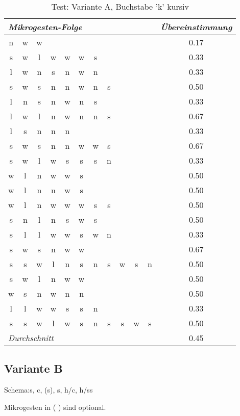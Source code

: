 \begin{table}[!h]
  \begin{center}
    \begin{tabular}{ c c c c c c c c c c c  | c }
\multicolumn{11}{l}{\emph{Mikrogesten-Folge}}&\emph{Übereinstimmung} \\ \hline
n&w&w&&&&&&&&&0.17 \\ \hline
s&w&l&w&w&w&s&&&&&0.33 \\ \hline
l&w&n&s&n&w&n&&&&&0.33 \\ \hline
s&w&s&n&n&w&n&s&&&&0.50\\ \hline
l&n&s&n&w&n&s&&&&&0.33\\ \hline
l&w&l&n&w&n&n&s&&&&0.67\\ \hline
l&s&n&n&n&&&&&&&0.33\\ \hline
s&w&s&n&n&w&w&s&&&&0.67 \\ \hline
s&w&l&w&s&s&s&n&&&&0.33\\ \hline
w&l&n&w&w&s&&&&&&0.50\\ \hline
w&l&n&n&w&s&&&&&&0.50\\ \hline
w&l&n&w&w&w&s&s&&&&0.50\\ \hline
s&n&l&n&s&w&s&&&&&0.50\\ \hline
s&l&l&w&w&s&w&n&&&&0.33\\ \hline
s&w&s&n&w&w&&&&&&0.67\\ \hline
s&s&w&l&n&s&n&s&w&s&n&0.50\\ \hline
s&w&l&n&w&w&&&&&&0.50\\ \hline
w&s&n&w&n&n&&&&&&0.50\\ \hline
l&l&w&w&s&s&n&&&&&0.33\\ \hline
s&s&w&l&w&s&n&s&s&w&s&0.50\\ \hline
\multicolumn{11}{l|}{\emph{Durchschnitt}}&  0.45 \\ \hline

    \end{tabular}
  \end{center}
  \caption{Test: Variante A, Buchstabe 'k' kursiv}
  \label{test_a_k}
\end{table}

\subsection{Variante B}


Schema:s, c, (s), s, h/c, h/ss

Mikrogesten in ( ) sind optional.

